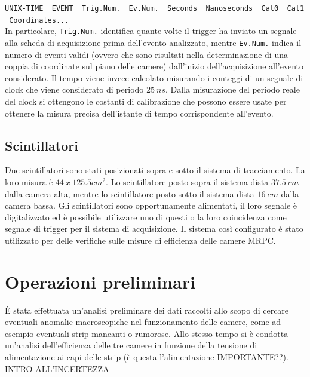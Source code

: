 \documentclass[8pt]{extarticle}
\begin{document}
 \normalsize \texttt{UNIX-TIME \ EVENT \ Trig.Num. \ Ev.Num. \ Seconds \ Nanoseconds \ Cal0 \ Cal1 \ Coordinates...} \\
 
 
\Large{In particolare, \texttt{Trig.Num.} identifica quante volte il trigger ha inviato un segnale alla scheda di acquisizione prima dell'evento analizzato, mentre \texttt{Ev.Num.} indica il numero di eventi validi (ovvero che sono risultati nella determinazione di una coppia di coordinate sul piano delle camere) dall'inizio dell'acquisizione all'evento considerato. Il tempo viene invece calcolato misurando i conteggi di un segnale di clock che viene considerato di periodo $25 \ ns$. Dalla misurazione del periodo reale del clock si ottengono le costanti di calibrazione che possono essere usate per ottenere la misura precisa dell'istante di tempo corrispondente all'evento.}


\subsection{Scintillatori}
Due scintillatori sono stati posizionati sopra e sotto il sistema di tracciamento. La loro misura è $44 \ x \ 125.5 cm^2$. Lo scintillatore posto sopra il sistema dista $37.5 \ cm$ dalla camera alta, mentre lo scintillatore posto sotto il sistema dista $16 \ cm$ dalla camera bassa. Gli scintillatori sono opportunamente alimentati, il loro segnale è digitalizzato ed è possibile utilizzare uno di questi o la loro coincidenza come segnale di trigger per il sistema di acquisizione. Il sistema così configurato è stato utilizzato per delle verifiche sulle misure di efficienza delle camere MRPC.

\section{Operazioni preliminari}
È stata effettuata un’analisi preliminare dei dati raccolti allo scopo di cercare eventuali anomalie macroscopiche nel funzionamento delle camere, come ad esempio eventuali strip mancanti o rumorose. Allo stesso tempo si è condotta un'analisi dell'efficienza delle tre camere in funzione della tensione di alimentazione ai capi delle strip (è questa l'alimentazione IMPORTANTE??). INTRO ALL'INCERTEZZA
\end{document}

